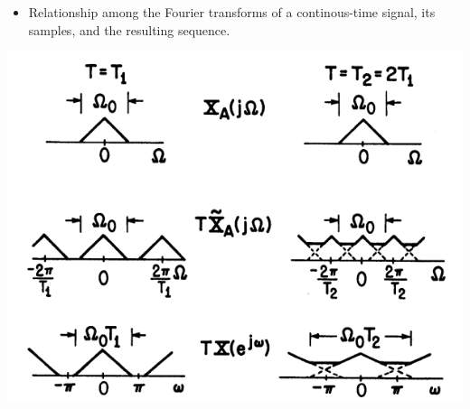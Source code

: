 \documentclass[pdflatex,compress,mathserif]{beamer}
\begin{document}
\begin{frame}
	\begin{itemize}
		\item Relationship among the Fourier transforms of a continous-time signal, its samples, and the resulting sequence.
	\end{itemize}
	\begin{center}
		\includegraphics[width=0.6\linewidth]{img/img02}
	\end{center}
\end{frame}
\end{document}
